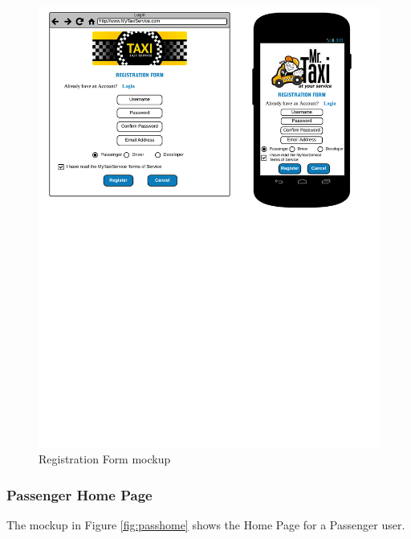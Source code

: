 \begin{figure}[htbp]
\centering
\includegraphics[width=\textwidth]{cpt/img/RegForm}
\caption{Registration Form mockup}
\label{fig:regform}
\end{figure}

\subsubsection{Passenger Home Page}
The mockup in Figure \ref{fig:passhome} shows the Home Page for a Passenger user.

